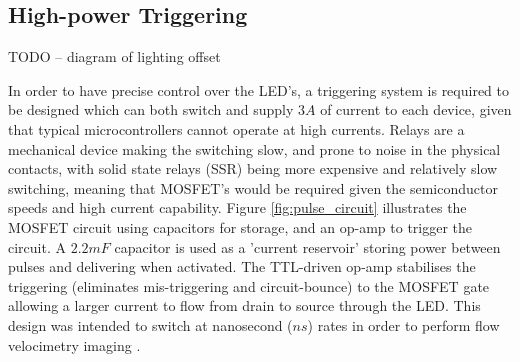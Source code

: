 \documentclass[fleqn,twoside,12pt]{report}
\begin{document}
\subsection{High-power Triggering}

TODO -- diagram of lighting offset
 

In order to have precise control over the LED's, a triggering system is required to be designed which can both switch and supply $3A$ of current to each device, given that typical microcontrollers cannot operate at high currents. Relays are a mechanical device making the switching slow, and prone to noise in the physical contacts, with solid state relays (SSR) being more expensive and relatively slow switching, meaning that MOSFET's would be required given the semiconductor speeds and high current capability. Figure \ref{fig:pulse_circuit} illustrates the MOSFET circuit using capacitors for storage, and an op-amp to trigger the circuit. A $2.2mF$ capacitor is used as a 'current reservoir' storing power between pulses and delivering when activated. The TTL-driven op-amp stabilises the triggering (eliminates mis-triggering and circuit-bounce) to the MOSFET gate allowing a larger current to flow from drain to source through the LED. This design was intended to switch at nanosecond ($ns$) rates in order to perform flow velocimetry imaging \cite{willert}. 
\end{document}
